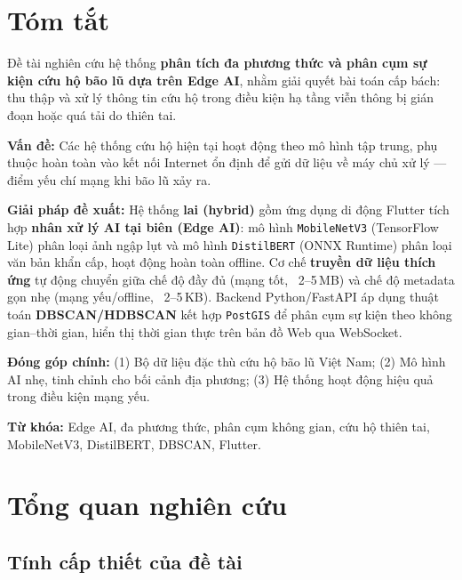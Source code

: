 \documentclass[12pt, a4paper]{report}
\newcommand{\keyword}[1]{\textbf{#1}}
\newcommand{\tech}[1]{\texttt{#1}}
\begin{document}
\chapter*{Tóm tắt}

Đề tài nghiên cứu hệ thống \keyword{phân tích đa phương thức và phân cụm sự kiện cứu hộ bão lũ dựa trên Edge AI}, nhằm giải quyết bài toán cấp bách: thu thập và xử lý thông tin cứu hộ trong điều kiện hạ tầng viễn thông bị gián đoạn hoặc quá tải do thiên tai.

\textbf{Vấn đề:} Các hệ thống cứu hộ hiện tại hoạt động theo mô hình tập trung, phụ thuộc hoàn toàn vào kết nối Internet ổn định để gửi dữ liệu về máy chủ xử lý — điểm yếu chí mạng khi bão lũ xảy ra.

\textbf{Giải pháp đề xuất:} Hệ thống \keyword{lai (hybrid)} gồm ứng dụng di động Flutter tích hợp \keyword{nhân xử lý AI tại biên (Edge AI)}: mô hình \tech{MobileNetV3} (TensorFlow Lite) phân loại ảnh ngập lụt và mô hình \tech{DistilBERT} (ONNX Runtime) phân loại văn bản khẩn cấp, hoạt động hoàn toàn offline. Cơ chế \keyword{truyền dữ liệu thích ứng} tự động chuyển giữa chế độ đầy đủ (mạng tốt, ~2–5\,MB) và chế độ metadata gọn nhẹ (mạng yếu/offline, ~2–5\,KB). Backend Python/FastAPI áp dụng thuật toán \keyword{DBSCAN/HDBSCAN} kết hợp \tech{PostGIS} để phân cụm sự kiện theo không gian–thời gian, hiển thị thời gian thực trên bản đồ Web qua WebSocket.

\textbf{Đóng góp chính:} (1) Bộ dữ liệu đặc thù cứu hộ bão lũ Việt Nam; (2) Mô hình AI nhẹ, tinh chỉnh cho bối cảnh địa phương; (3) Hệ thống hoạt động hiệu quả trong điều kiện mạng yếu.

\textbf{Từ khóa:} Edge AI, đa phương thức, phân cụm không gian, cứu hộ thiên tai, MobileNetV3, DistilBERT, DBSCAN, Flutter.

\tableofcontents
\listoffigures
\listoftables

\chapter{Tổng quan nghiên cứu}

\section{Tính cấp thiết của đề tài}
\end{document}
